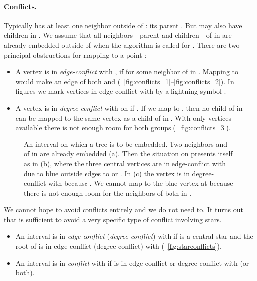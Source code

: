 \documentclass[11pt,a4paper,colorlinks=true,urlcolor=blue,citecolor=red]{article}
\theoremstyle{plain}
\newcommand{\subsubparagraph}[1]{\paragraph{#1}}
\begin{document}
\subsubparagraph{Conflicts.} Typically  has at least one
neighbor outside of : its parent . But  may also have
children in . We assume that all neighbors---parent and
children---of  in  are already embedded outside of
 when the algorithm is called for . There are two principal
obstructions for mapping  to a point :
\begin{itemize}
\item A vertex  is in \emph{edge-conflict} with , if
   for some neighbor  of  in
  . Mapping  to  would make  an edge of
  both  and 
  (\figurename~\ref{fig:conflicts_1}--\ref{fig:conflicts_2}). In figures
  we mark vertices in edge-conflict with  by a lightning symbol
  \Lightning.
\item A vertex  is in \emph{degree-conflict} with  on  if
  . If we map  to , then no child of
   in  can be mapped to the same vertex as a child of  in
  . With only  vertices available there is not enough room for
  both groups (\figurename~\ref{fig:conflicts_3}).
\end{itemize}
\begin{figure}[htbp]
  \centering {}\hfil
  \hfil
  \hfil
  \caption{An interval  on which a tree  is to be
    embedded. Two neighbors  and  of  in  are
    already embedded (a). Then the situation on  presents itself
    as in (b), where the three central vertices are in edge-conflict
    with  due to blue outside edges to  or .  In (c) the vertex
     is in degree-conflict with  because
    . We cannot map  to the blue
    vertex at  because there is not enough room for the neighbors of
    both in .\label{fig:conflicts}}
\end{figure}

We cannot hope to avoid conflicts entirely and we do not need to. It
turns out that is sufficient to avoid a very specific type of conflict
involving stars.
\begin{itemize}
\item An interval  is in \emph{edge-conflict}
  (\emph{degree-conflict}) with  if  is a
  central-star and the root of  is in edge-conflict
  (degree-conflict) with  (\figurename~\ref{fig:starconflicts}).
\item An interval  is in \emph{conflict} with  if  is in
  edge-conflict or degree-conflict with  (or both).
\end{itemize}
\end{document}
